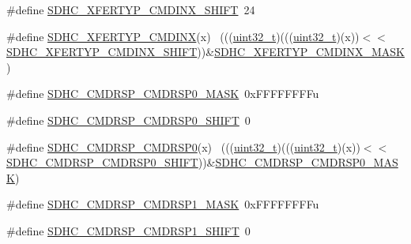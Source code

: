 \begin{DoxyCompactItemize}
\item 
\#define \hyperlink{group___s_d_h_c___register___masks_ga3ff92ff3a2de4c2006862e08e92198a2}{S\+D\+H\+C\+\_\+\+X\+F\+E\+R\+T\+Y\+P\+\_\+\+C\+M\+D\+I\+N\+X\+\_\+\+S\+H\+I\+FT}~24
\item 
\#define \hyperlink{group___s_d_h_c___register___masks_ga13e573f4fdfd45bbd7320ef8c3145b8d}{S\+D\+H\+C\+\_\+\+X\+F\+E\+R\+T\+Y\+P\+\_\+\+C\+M\+D\+I\+NX}(x)                                  ~(((\hyperlink{_p_e___types_8h_a33594304e786b158f3fb30289278f5af}{uint32\+\_\+t})(((\hyperlink{_p_e___types_8h_a33594304e786b158f3fb30289278f5af}{uint32\+\_\+t})(x))$<$$<$\hyperlink{group___s_d_h_c___register___masks_ga3ff92ff3a2de4c2006862e08e92198a2}{S\+D\+H\+C\+\_\+\+X\+F\+E\+R\+T\+Y\+P\+\_\+\+C\+M\+D\+I\+N\+X\+\_\+\+S\+H\+I\+FT}))\&\hyperlink{group___s_d_h_c___register___masks_ga38c578078fbe7eae9b211d4e75eb9dd0}{S\+D\+H\+C\+\_\+\+X\+F\+E\+R\+T\+Y\+P\+\_\+\+C\+M\+D\+I\+N\+X\+\_\+\+M\+A\+SK})
\item 
\#define \hyperlink{group___s_d_h_c___register___masks_ga0e18ea51c0f8c567b8c7f0c8daed3a3f}{S\+D\+H\+C\+\_\+\+C\+M\+D\+R\+S\+P\+\_\+\+C\+M\+D\+R\+S\+P0\+\_\+\+M\+A\+SK}~0x\+F\+F\+F\+F\+F\+F\+F\+Fu
\item 
\#define \hyperlink{group___s_d_h_c___register___masks_gaea81f8c10607500c0232c031cb1c736b}{S\+D\+H\+C\+\_\+\+C\+M\+D\+R\+S\+P\+\_\+\+C\+M\+D\+R\+S\+P0\+\_\+\+S\+H\+I\+FT}~0
\item 
\#define \hyperlink{group___s_d_h_c___register___masks_ga36d10a52098a0cc15350111828da0d6c}{S\+D\+H\+C\+\_\+\+C\+M\+D\+R\+S\+P\+\_\+\+C\+M\+D\+R\+S\+P0}(x)                                  ~(((\hyperlink{_p_e___types_8h_a33594304e786b158f3fb30289278f5af}{uint32\+\_\+t})(((\hyperlink{_p_e___types_8h_a33594304e786b158f3fb30289278f5af}{uint32\+\_\+t})(x))$<$$<$\hyperlink{group___s_d_h_c___register___masks_gaea81f8c10607500c0232c031cb1c736b}{S\+D\+H\+C\+\_\+\+C\+M\+D\+R\+S\+P\+\_\+\+C\+M\+D\+R\+S\+P0\+\_\+\+S\+H\+I\+FT}))\&\hyperlink{group___s_d_h_c___register___masks_ga0e18ea51c0f8c567b8c7f0c8daed3a3f}{S\+D\+H\+C\+\_\+\+C\+M\+D\+R\+S\+P\+\_\+\+C\+M\+D\+R\+S\+P0\+\_\+\+M\+A\+SK})
\item 
\#define \hyperlink{group___s_d_h_c___register___masks_gaf2029a539168eda397f19588b928af0f}{S\+D\+H\+C\+\_\+\+C\+M\+D\+R\+S\+P\+\_\+\+C\+M\+D\+R\+S\+P1\+\_\+\+M\+A\+SK}~0x\+F\+F\+F\+F\+F\+F\+F\+Fu
\item 
\#define \hyperlink{group___s_d_h_c___register___masks_ga5954455de5b963fe88033ee57abc8682}{S\+D\+H\+C\+\_\+\+C\+M\+D\+R\+S\+P\+\_\+\+C\+M\+D\+R\+S\+P1\+\_\+\+S\+H\+I\+FT}~0

\end{DoxyCompactItemize}

